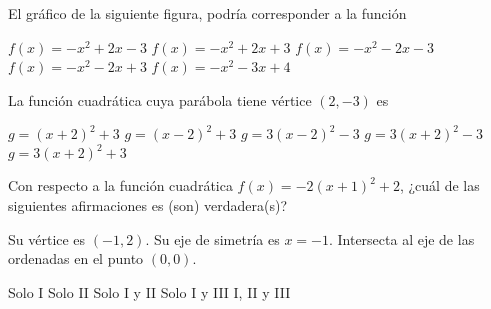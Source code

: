 \documentclass[sin nombre]{srs2}
\begin{document}
\begin{preguntas}
\pregunta El gráfico de la siguiente figura, podría corresponder a la función
\begin{columnas}[0.6]
\begin{alternativas}
\alternativa $f\left(x\right) = -x^2 + 2x - 3$
\alternativa $f\left(x\right) = -x^2 + 2x + 3$
\alternativa $f\left(x\right) = -x^2 - 2x - 3$
\alternativa $f\left(x\right) = -x^2 - 2x + 3$
\alternativa $f\left(x\right) = -x^2 - 3x + 4$
\end{alternativas}
\siguiente
{}
\end{columnas}

\pregunta La función cuadrática cuya parábola tiene vértice $\left(2, -3\right)$ es
\begin{alternativas}
\alternativa $g = \left(x + 2\right)^2 + 3$
\alternativa $g = \left(x - 2\right)^2 + 3$
\alternativa $g = 3\left(x - 2\right)^2 - 3$
\alternativa $g = 3\left(x + 2\right)^2 - 3$
\alternativa $g = 3\left(x + 2\right)^2 + 3$
\end{alternativas}

\pregunta Con respecto a la función cuadrática $f\left(x\right) = -2\left(x + 1\right)^2 + 2$, ¿cuál de las siguientes afirmaciones es (son) verdadera(s)?
\begin{opciones}
\opcion Su vértice es $\left(-1, 2\right)$.
\opcion Su eje de simetría es $x = -1$.
\opcion Intersecta al eje de las ordenadas en el punto $\left(0, 0\right)$.
\end{opciones}
\begin{alternativas}
\alternativa Solo I
\alternativa Solo II
\alternativa Solo I y II
\alternativa Solo I y III
\alternativa I, II y III
\end{alternativas}


\end{preguntas}
\end{document}
